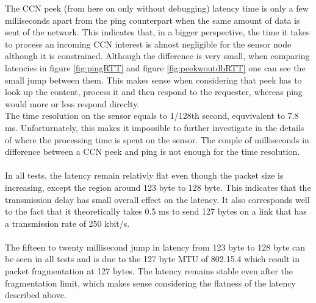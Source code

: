 The CCN peek (from here on only without debugging) latency time is only a few milliseconds apart from the ping counterpart when the same amount of data is sent of the network. This indicates that, in a bigger perspective, the time it takes to process an incoming CCN interest is almost negligible for the sensor node although it is constrained. Although the difference is very small, when comparing latencies in figure \ref{fig:pingRTT} and figure \ref{fig:peekwoutdbRTT} one can see the small jump between them. This makes sense when considering that peek has to look up the content, process it and then respond to the requester, whereas ping would more or less respond direclty.\\
The time resolution on the sensor equals to 1/128th second, equvivalent to 7.8 ms. Unforturnately, this makes it impossible to further investigate in the details of where the processing time is spent on the sensor. The couple of milliseconds in difference between a CCN peek and ping is not enough for the time resolution.
\\\\
In all tests, the latency remain relativly flat even though the packet size is increasing, except the region around 123 byte to 128 byte. This indicates that the transmission delay has small overall effect on the latency. It also corresponds well to the fact that it theoretically takes 0.5 ms to send 127 bytes on a link that has a transmission rate of 250 kbit/s.
\\\\
The fifteen to twenty millisecond jump in latency from 123 byte to 128 byte can be seen in all tests and is due to the 127 byte MTU of 802.15.4 which result in packet fragmentation at 127 bytes. The latency remains stable even after the fragmentation limit, which makes sense considering the flatness of the latency described above.
\\\\
